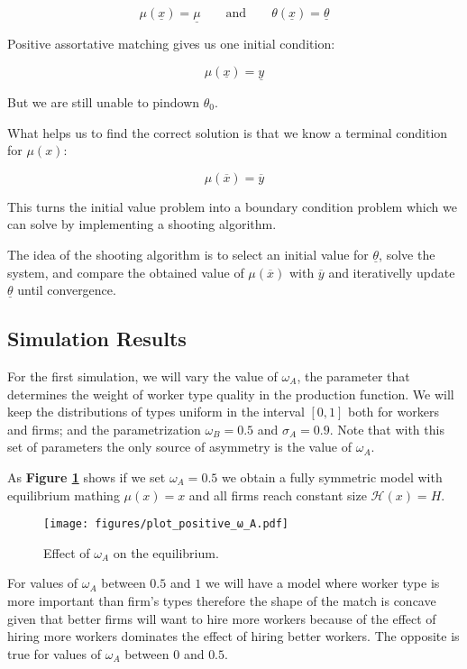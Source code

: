 \documentclass[12pt]{article}
\theoremstyle{definition}
\begin{document}
$$\mu(\underline{x}) = \underline{\mu} \qquad \text{and} \qquad \theta(\underline{x}) = \underline{\theta}$$

Positive assortative matching gives us one initial condition:

$$\mu(\underline{x}) = \underline{y}$$

But we are still unable to pindown $\theta_0$.

What helps us to find the correct solution is that we know a terminal condition for $\mu(x)$:

\[\mu(\overline{x}) = \overline{y}\]

This turns the initial value problem into a boundary condition problem which we can solve by implementing a shooting algorithm.

The idea of the shooting algorithm is to select an initial value for $\underline{\theta}$, solve the system, and compare the obtained value of $\mu(\overline{x})$ with $\overline{y}$ and iterativelly update $\underline{\theta}$ until convergence.


\subsection{Simulation Results}

For the first simulation, we will vary the value of $\omega_A$, the parameter that determines the weight of worker type quality in the production function. 
We will keep the distributions of types uniform in the interval $[0,1]$ both for workers and firms; and the parametrization $\omega_B = 0.5$ and $\sigma_A = 0.9$.
Note that with this set of parameters the only source of asymmetry is the value of $\omega_A$.

As \textbf{Figure \ref{fig:sim_omega_A}} shows if we set $\omega_A = 0.5$ we obtain a fully symmetric model with equilibrium mathing $\mu(x) = x$ and all firms reach constant size $\mathcal{H}(x)=H$.

\begin{figure}[h]
    \begin{center}
        \texttt{[image: figures/plot\_positive\_ω\_A.pdf]}
        \caption{Effect of $\omega_A$ on the equilibrium.}
        \label{fig:sim_omega_A}
    \end{center}
\end{figure}

For values of $\omega_A$ between $0.5$ and $1$ we will have a model where worker type is more important than firm's types therefore the shape of the match is concave given that better firms will want to hire more workers because of the effect of hiring more workers dominates the effect of hiring better workers. The opposite is true for values of $\omega_A$ between $0$ and $0.5$.
\end{document}
